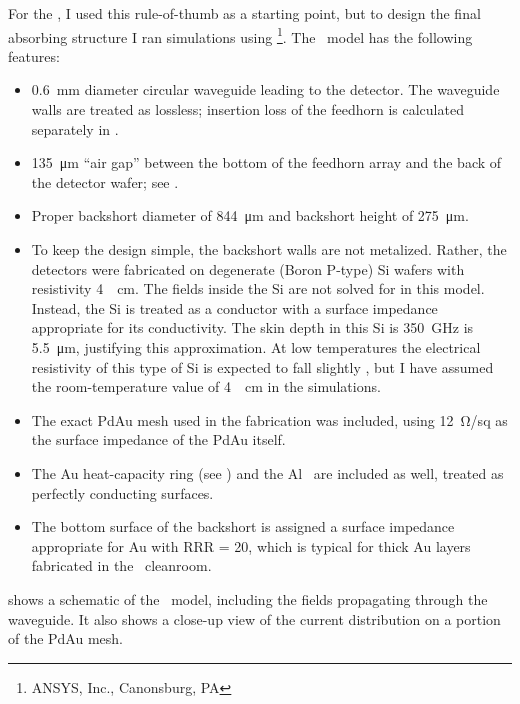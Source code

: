 For the \Imager, I used this rule-of-thumb as a starting point, but to design the final absorbing structure I ran simulations using \HFSS\footnote{ANSYS, Inc., Canonsburg, PA}.
The \HFSS\ model has the following features:
\begin{itemize}
\item \SI{0.6}{\mm} diameter circular waveguide leading to the detector.
      The waveguide walls are treated as lossless; insertion loss of the feedhorn is calculated separately in . 
\item \SI{135}{\um} ``air gap'' between the bottom of the feedhorn array and the back of the detector wafer; see .
\item Proper backshort diameter of \SI{844}{\um} and backshort height of \SI{275}{\um}.
\item To keep the design simple, the backshort walls are not metalized.
      Rather, the detectors were fabricated on degenerate (Boron P-type) Si wafers with resistivity \SI{4}{\mOhm\cm}.
      The fields inside the Si are not solved for in this model.
      Instead, the Si is treated as a conductor with a surface impedance appropriate for its conductivity.
      The skin depth in this Si is \SI{350}{\GHz} is \SI{5.5}{\um}, justifying this approximation.
      At low temperatures the electrical resistivity of this type of Si is expected to fall slightly \cite{chapman_electrical_1963}, but I have assumed the room-temperature value of \SI{4}{\mOhm\cm} in the simulations.
\item The exact PdAu mesh used in the fabrication was included, using \SI{12}{\ohm}/sq as the surface impedance of the PdAu itself.
\item The Au heat-capacity ring (see ) and the Al \TES\ are included as well, treated as perfectly conducting surfaces.
\item The bottom surface of the backshort is assigned a surface impedance appropriate for Au with RRR = 20, which is typical for thick Au layers fabricated in the \NIST\ cleanroom.
\end{itemize}
 shows a schematic of the \HFSS\ model, including the fields propagating through the waveguide.
It also shows a close-up view of the current distribution on a portion of the PdAu mesh.


